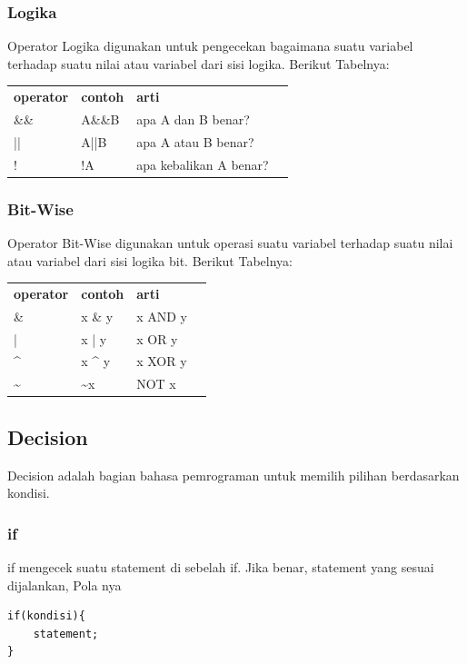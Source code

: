 \documentclass[12pt,]{article}
\begin{document}
	\subsubsection{Logika}
	Operator Logika digunakan untuk pengecekan bagaimana suatu variabel terhadap suatu nilai atau variabel dari sisi logika.
	Berikut Tabelnya:
	\begin{table}[H]
		\begin{tabular}{|l|l|l|l}
			\cline{1-3}
			\textbf{operator} & \textbf{contoh} & \textbf{arti} \\ \cline{1-3}
			\&\&              & A\&\&B          & apa A dan B benar? \\ \cline{1-3}
			||                & A||B            & apa A atau B benar? \\ \cline{1-3}
			!                 & !A              & apa kebalikan A benar?  \\ \cline{1-3}
		\end{tabular}
	\end{table}
	
	\subsubsection{Bit-Wise}
	Operator Bit-Wise digunakan untuk operasi suatu variabel terhadap suatu nilai atau variabel dari sisi logika bit.
	Berikut Tabelnya:
	\begin{table}[H]
		\begin{tabular}{|l|l|l|l}
			\cline{1-3}
			\textbf{operator} & \textbf{contoh} & \textbf{arti} \\ \cline{1-3}
			\&             & x \& y       & x AND y  \\ \cline{1-3}
			|              & x | y        & x OR y	 \\ \cline{1-3}
			\^{}           & x \^{} y     & x XOR y  \\ \cline{1-3}
			\textasciitilde & \textasciitilde x & NOT x  \\ \cline{1-3}
		\end{tabular}
	\end{table}

	\newpage
	\subsection{Decision}
	
	Decision adalah bagian bahasa pemrograman untuk memilih pilihan berdasarkan kondisi.
	
	\subsubsection{if}
	if mengecek suatu statement di sebelah if.
	Jika benar, statement yang sesuai dijalankan,
	Pola nya
	\begin{verbatim}
if(kondisi){
	statement;
}
	\end{verbatim}
	
\end{document}
